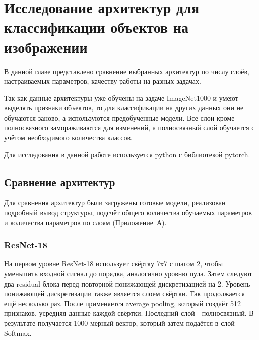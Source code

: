 \newpage
\section{Исследование архитектур для классификации объектов на изображении}
В данной главе представлено сравнение выбранных архитектур по числу слоёв, настраиваемых параметров, качеству работы на разных задачах.

Так как данные архитектуры уже обучены на задаче ImageNet1000 и умеют выделять признаки объектов, то для классификации на других данных они не обучаются заново, а используются предобученные модели. Все слои кроме полносвязного замораживаются для изменений, а полносвязный слой обучается с учётом необходимого количества классов.

Для исследования в данной работе используется python с библиотекой pytorch.

\subsection{Сравнение архитектур}
Для сравнения архитектур были загружены готовые модели, реализован подробный вывод структуры, подсчёт общего количества обучаемых параметров и количества параметров по слоям (Приложение~А).

\subsubsection{ResNet-18}
На первом уровне ResNet-18 использует свёртку 7x7 с шагом 2, чтобы уменьшить входной сигнал до порядка, аналогично уровню пула. Затем следуют два residual блока перед повторной понижающей дискретизацией на 2. Уровень понижающей дискретизации также является слоем свёртки. Так продолжается ещё несколько раз. После применяется average pooling, который создаёт 512 признаков, усредняя данные каждой свёртки. Последний слой - полносвязный. В результате получается 1000-мерный вектор, который затем подаётся в слой Softmax.
\\

